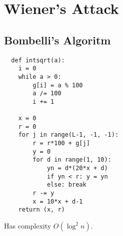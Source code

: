 \chapter{Wiener's Attack}

\section{Bombelli's Algoritm}

\begin{verbatim}
  def intsqrt(a):
    i = 0
    while a > 0:
        g[i] = a % 100
        a /= 100
        i += 1

    x = 0
    r = 0
    for j in range(L-1, -1, -1):
        r = r*100 + g[j]
        y = 0
        for d in range(1, 10):
            yn = d*(20*x + d)
            if yn < r: y = yn
            else: break
        r -= y
        x = 10*x + d-1
    return (x, r)
\end{verbatim}
Has complexity $O(\log ^2 n)$.
